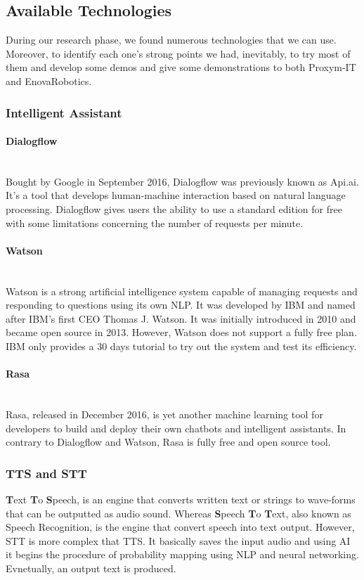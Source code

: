 \subsection{Available Technologies}
During our research phase, we found numerous technologies that we can use. Moreover, to identify each one's strong points we had, inevitably, to try most of them and develop some demos and give some demonstrations to both Proxym-IT and EnovaRobotics. 
\subsubsection{Intelligent Assistant}
\paragraph{Dialogflow}~\\
Bought by Google in September 2016, Dialogflow was previously known as Api.ai. It's a tool that develops human-machine interaction based on natural language processing. Dialogflow gives users the ability to use a standard edition for free with some limitations concerning the number of requests per minute\cite{10}.


\paragraph{Watson}~\\
Watson is a strong artificial intelligence system capable of managing requests and responding to questions using its own NLP. It was developed by IBM and named after IBM's first CEO Thomas J. Watson. It was initially introduced in 2010 and became open source in 2013. However, Watson does not support a fully free plan. IBM only provides a 30 days tutorial to try out the system and test its efficiency\cite{11}.



\paragraph{Rasa}~\\
Rasa, released in December 2016, is yet another machine learning tool for developers to build and deploy their own chatbots and intelligent assistants. In contrary to Dialogflow and Watson, Rasa is fully free and open source tool.



\subsubsection{TTS and STT}
\textbf{T}ext \textbf{T}o \textbf{S}peech, is an engine that converts written text or strings to wave-forms that can be outputted as audio sound. Whereas \textbf{S}peech \textbf{T}o \textbf{T}ext, also known as Speech Recognition, is the engine that convert speech into text output. However, STT is more complex that TTS. It basically saves the input audio and using AI it begins the procedure of probability mapping using NLP and neural networking. Evnetually, an output text is produced.   

